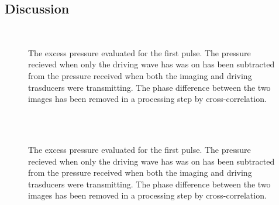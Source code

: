 \subsection{Discussion}


\begin{figure}[t]%
  \centering
 \quad
  \subfloat[2nd pulse - 150]{
    \label{fig:exp:2nd:av:time:150:comp:control:cross:full}
    }\\
\quad
  \subfloat[2nd pulse - 250]{
    \label{fig:exp:2nd:av:time:150:comp:control:cross:full}
    }
\caption{
    The excess pressure evaluated for the first pulse.  
    The pressure recieved when only the driving wave has was on has been subtracted from the pressure received when both the imaging and driving trasducers were transmitting.
    The phase difference between the two images has been removed in a processing step by cross-correlation.
  }
  \label{fig:exp:2nd:av:time:comp:control:cross}
\end{figure}

\clearpage

\begin{figure}[t]%
  \centering
 \quad
  \subfloat[2nd pulse - 150]{
    \label{fig:exp:2nd:av:time:150:comp:control:cross:full}
    }\\
 \quad
  \subfloat[2nd pulse - 150]{
    \label{fig:exp:2nd:av:time:150:comp:control:cross:full}
    }\\
\caption{
    The excess pressure evaluated for the first pulse.  
    The pressure recieved when only the driving wave has was on has been subtracted from the pressure received when both the imaging and driving trasducers were transmitting.
    The phase difference between the two images has been removed in a processing step by cross-correlation.
  }
  \label{fig:exp:2nd:av:time:comp:control:cross}
\end{figure}


